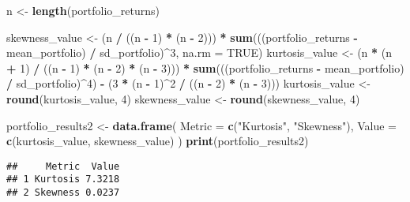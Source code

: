 \documentclass[
]{article}
\newenvironment{Shaded}{\begin{snugshade}}{\end{snugshade}}
\newcommand{\AttributeTok}[1]{\textcolor[rgb]{0.13,0.29,0.53}{#1}}
\newcommand{\ConstantTok}[1]{\textcolor[rgb]{0.56,0.35,0.01}{#1}}
\newcommand{\DecValTok}[1]{\textcolor[rgb]{0.00,0.00,0.81}{#1}}
\newcommand{\FunctionTok}[1]{\textcolor[rgb]{0.13,0.29,0.53}{\textbf{#1}}}
\newcommand{\NormalTok}[1]{#1}
\newcommand{\OtherTok}[1]{\textcolor[rgb]{0.56,0.35,0.01}{#1}}
\newcommand{\SpecialCharTok}[1]{\textcolor[rgb]{0.81,0.36,0.00}{\textbf{#1}}}
\newcommand{\StringTok}[1]{\textcolor[rgb]{0.31,0.60,0.02}{#1}}
\begin{document}
\begin{Shaded}
\begin{Highlighting}[]
\NormalTok{n }\OtherTok{\textless{}{-}} \FunctionTok{length}\NormalTok{(portfolio\_returns)}

\NormalTok{skewness\_value }\OtherTok{\textless{}{-}}\NormalTok{ (n }\SpecialCharTok{/}\NormalTok{ ((n }\SpecialCharTok{{-}} \DecValTok{1}\NormalTok{) }\SpecialCharTok{*}\NormalTok{ (n }\SpecialCharTok{{-}} \DecValTok{2}\NormalTok{))) }\SpecialCharTok{*} \FunctionTok{sum}\NormalTok{(((portfolio\_returns }\SpecialCharTok{{-}}\NormalTok{ mean\_portfolio) }\SpecialCharTok{/}\NormalTok{ sd\_portfolio)}\SpecialCharTok{\^{}}\DecValTok{3}\NormalTok{, }\AttributeTok{na.rm =} \ConstantTok{TRUE}\NormalTok{)}
\NormalTok{kurtosis\_value }\OtherTok{\textless{}{-}}\NormalTok{ (n }\SpecialCharTok{*}\NormalTok{ (n }\SpecialCharTok{+} \DecValTok{1}\NormalTok{) }\SpecialCharTok{/}\NormalTok{ ((n }\SpecialCharTok{{-}} \DecValTok{1}\NormalTok{) }\SpecialCharTok{*}\NormalTok{ (n }\SpecialCharTok{{-}} \DecValTok{2}\NormalTok{) }\SpecialCharTok{*}\NormalTok{ (n }\SpecialCharTok{{-}} \DecValTok{3}\NormalTok{))) }\SpecialCharTok{*} 
                  \FunctionTok{sum}\NormalTok{(((portfolio\_returns }\SpecialCharTok{{-}}\NormalTok{ mean\_portfolio) }\SpecialCharTok{/}\NormalTok{ sd\_portfolio)}\SpecialCharTok{\^{}}\DecValTok{4}\NormalTok{) }\SpecialCharTok{{-}} 
\NormalTok{                  (}\DecValTok{3} \SpecialCharTok{*}\NormalTok{ (n }\SpecialCharTok{{-}} \DecValTok{1}\NormalTok{)}\SpecialCharTok{\^{}}\DecValTok{2} \SpecialCharTok{/}\NormalTok{ ((n }\SpecialCharTok{{-}} \DecValTok{2}\NormalTok{) }\SpecialCharTok{*}\NormalTok{ (n }\SpecialCharTok{{-}} \DecValTok{3}\NormalTok{)))}
\NormalTok{kurtosis\_value }\OtherTok{\textless{}{-}} \FunctionTok{round}\NormalTok{(kurtosis\_value, }\DecValTok{4}\NormalTok{)}
\NormalTok{skewness\_value }\OtherTok{\textless{}{-}} \FunctionTok{round}\NormalTok{(skewness\_value, }\DecValTok{4}\NormalTok{)}

\NormalTok{portfolio\_results2 }\OtherTok{\textless{}{-}} \FunctionTok{data.frame}\NormalTok{(}
  \AttributeTok{Metric =} \FunctionTok{c}\NormalTok{(}\StringTok{"Kurtosis"}\NormalTok{, }\StringTok{"Skewness"}\NormalTok{),}
  \AttributeTok{Value =} \FunctionTok{c}\NormalTok{(kurtosis\_value, skewness\_value)}
\NormalTok{)}
\FunctionTok{print}\NormalTok{(portfolio\_results2)}
\end{Highlighting}
\end{Shaded}

\begin{verbatim}
##     Metric  Value
## 1 Kurtosis 7.3218
## 2 Skewness 0.0237
\end{verbatim}
\end{document}
